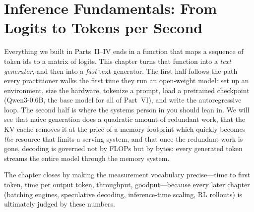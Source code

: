 \chapter{Inference Fundamentals: From Logits to Tokens per Second}\label{ch:inference}

Everything we built in Parts~II--IV ends in a function that maps a sequence of token ids
to a matrix of logits. This chapter turns that function into a \emph{text generator}, and then
into a \emph{fast} text generator. The first half follows the path every practitioner walks the
first time they run an open-weight model: set up an environment, size the hardware, tokenize a
prompt, load a pretrained checkpoint (Qwen3-0.6B, the base model for all of Part~VI), and write
the autoregressive loop. The second half is where the systems person in you should lean in.
We will see that naive generation does a quadratic amount of redundant work, that the KV cache
removes it at the price of a memory footprint which quickly becomes \emph{the} resource that
limits a serving system, and that once the redundant work is gone, decoding is governed not by
FLOPs but by bytes: every generated token streams the entire model through the memory system.

The chapter closes by making the measurement vocabulary precise---time to first token, time per
output token, throughput, goodput---because every later chapter (batching engines, speculative
decoding, inference-time scaling, RL rollouts) is ultimately judged by these numbers.

